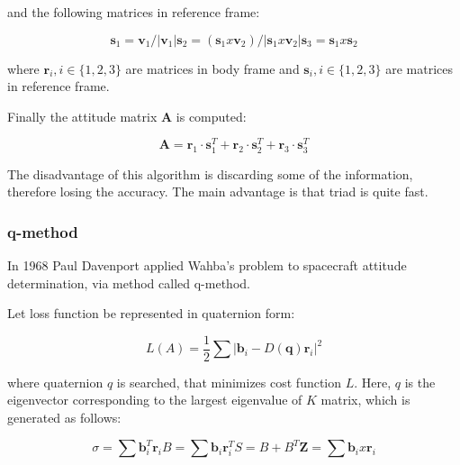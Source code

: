 \documentclass[12pt,a4paper,twoside]{article}
\begin{document}
and the following matrices in reference frame:

\begin{subequations}
\begin{equation}
\bm{s}_1 = \bm{v}_1/|\bm{v}_1|
\end{equation}
\begin{equation}
\bm{s}_2 = (\bm{s}_1 x \bm{v}_2) /|\bm{s}_1 x \bm{v}_2|
\end{equation}
\begin{equation}
\bm{s}_3 = \bm{s}_1 x \bm{s}_2
\end{equation}
\end{subequations}

where $\bm{r}_i, i\in\{1, 2, 3\}$ are matrices in body frame and $\bm{s}_i, i\in\{1, 2, 3\}$ are matrices in reference frame.


Finally the attitude matrix $\bm{A}$ is computed:

\begin{equation}
\bm{A} = \bm{r}_1 \cdot \bm{s}_1^T + \bm{r}_2 \cdot \bm{s}_2^T + \bm{r}_3 \cdot \bm{s}_3^T 
\end{equation}


The disadvantage of this algorithm is discarding some of the information, therefore losing the accuracy. The main advantage is that \gls{triad} is quite fast.


\subsubsection{q-method}

In 1968 Paul Davenport applied Wahba’s problem to spacecraft attitude determination, via method called q-method\cite{keat1977analysis}. 

Let loss function be represented in quaternion form:

\begin{equation}
L(A) = \frac{1}{2} \sum |\bm{b}_i - D(\bm{q})\bm{r}_i|^2
\end{equation}

where quaternion $q$ is searched, that minimizes cost function $L$. Here, $q$ is the eigenvector corresponding to the largest eigenvalue of $K$ matrix, which is generated as follows:

\begin{subequations}
\begin{equation}
\sigma = \sum \bm{b}_i^T\bm{r}_i
\end{equation}
\begin{equation}
B = \sum \bm{b}_i\bm{r}_i^T
\end{equation}
\begin{equation}
S = B + B^T
\end{equation}
\begin{equation}
\bm{Z} = \sum \bm{b}_i x \bm{r}_i
\end{equation}
\end{subequations}
\end{document}
